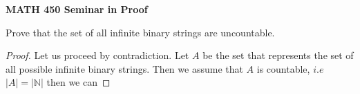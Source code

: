 \documentclass[14pt]{article}
\newcommand{\N}{\mathbb N}
\begin{document}
\begin{center}
		
{\bf MATH 450 Seminar in Proof}
 \\
\end{center}
	Prove that the set of all infinite binary strings are uncountable.
\begin{proof}
	Let us proceed by contradiction. Let $A$ be the set that represents the set of all possible infinite binary strings. Then we assume that $A$ is countable, $i.e$ $|A| = | \N |$ then we can 
\end{proof}
\end{document}
